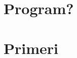 \documentclass[a4paper, 10pt]{article}
\begin{document}
\section{Program?}


\section{Primeri}
\end{document}
